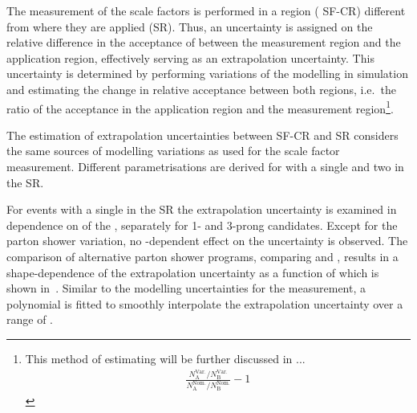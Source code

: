 
\begin{table}[htbp]
  \centering

  

  \caption{Uncertainty based on the comparison of scale factors
    measured for triggers with $\pTHLT > \SI{25}{\GeV}$ and
    $\pTHLT > \SI{35}{\GeV}$. The impact on the normalisation of
    \ttbar with a leading \tauhadvis candidate originating from jets
    and \pTvis close to the threshold of \SI{40}{\GeV} is shown.}
  \label{tab:ttbarSF_tau25_35_uncertainty}
\end{table}

The measurement of the scale factors is performed in a region (\lephad
SF-CR) different from where they are applied (\hadhad SR). Thus, an
uncertainty is assigned on the relative difference in the acceptance
of \ttbarFakes between the measurement region and the application
region, effectively serving as an extrapolation uncertainty. This
uncertainty is determined by performing variations of the \ttbar
modelling in simulation and estimating the change in relative
acceptance between both regions, i.e.\ the ratio of the acceptance in
the application region and the measurement region\footnote{This method
  of estimating will be further discussed in ...
  \begin{align*}
    \frac{N_\text{A}^\text{Var.} / N_\text{B}^\text{Var.}}{N_\text{A}^\text{Nom.} / N_\text{B}^\text{Nom.}} - 1
  \end{align*}
}.

The estimation of extrapolation uncertainties between SF-CR and
\hadhad SR considers the same sources of \ttbar modelling variations
as used for the scale factor measurement. Different parametrisations
are derived for \ttbar with a single \faketauhadvis and two
\faketauhadvis in the \hadhad SR.

For \ttbar events with a single \faketauhadvis in the \hadhad SR the
extrapolation uncertainty is examined in dependence on \pT of the
\faketauhadvis, separately for 1- and 3-prong candidates. Except for
the parton shower variation, no \pT-dependent effect on the
uncertainty is observed.  The comparison of alternative parton shower
programs, comparing \PYTHIA[8] and \HERWIG[7], results in a
shape-dependence of the extrapolation uncertainty as a function of
\tauhadvis \pT which is shown in~.
Similar to the modelling uncertainties for the measurement, a
polynomial is fitted to smoothly interpolate the extrapolation
uncertainty over a range of \tauhadvis \pT. 

